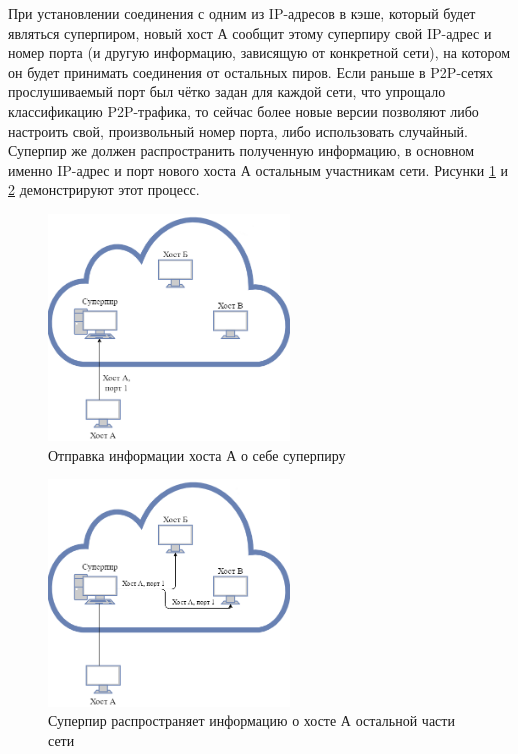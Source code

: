 \documentclass[bachelor, och, coursework]{SCWorks}
\begin{document}
При установлении соединения с одним из IP-адресов в кэше, который будет являться суперпиром, новый хост А сообщит этому суперпиру свой IP-адрес и номер порта (и другую информацию, зависящую от конкретной сети), на котором он будет принимать соединения от остальных пиров. Если раньше в P2P-сетях прослушиваемый порт был чётко задан для каждой сети, что упрощало классификацию P2P-трафика, то сейчас более новые версии позволяют либо настроить свой, произвольный номер порта, либо использовать случайный. Суперпир же должен распространить полученную информацию, в основном именно IP-адрес и порт нового хоста А остальным участникам сети. Рисунки \ref{IPPort1.png} и \ref{IPPort2.png} демонстрируют этот процесс.
\begin{figure}[H]
    \centering
    \includegraphics[width=0.57\textwidth]{IPPort1.png}
    \caption{Отправка информации хоста А о себе суперпиру}
    \label{IPPort1.png}
\end{figure}

\begin{figure}[H]
    \centering
    \includegraphics[width=0.57\textwidth]{IPPort2.png}
    \caption{Суперпир распространяет информацию о хосте А остальной части сети}
    \label{IPPort2.png}
\end{figure}
\end{document}
